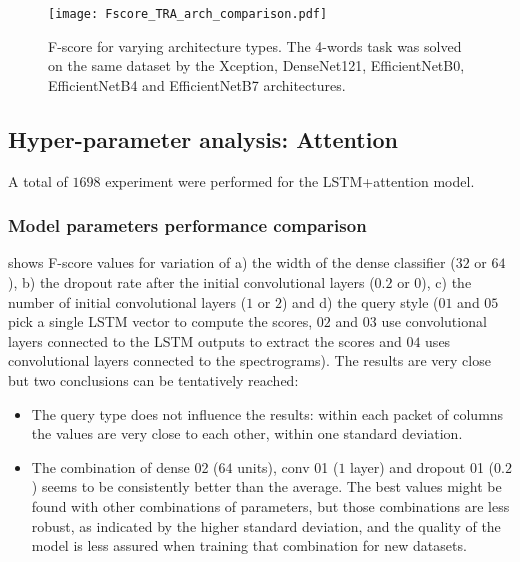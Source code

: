 
\begin{figure}[h!]
    \centering
    \texttt{[image: Fscore\_TRA\_arch\_comparison.pdf]}
    \caption{F-score for varying
        architecture types.
        The 4-words task was solved on the same dataset by the 
        Xception, DenseNet121, EfficientNetB0, EfficientNetB4 and
        EfficientNetB7 architectures.
    }%
    \label{fig:tra_comparison_arch}
\end{figure}

\subsection{Hyper-parameter analysis: Attention}

A total of $1698$ experiment were performed for the LSTM+attention model.

\subsubsection{Model parameters performance comparison}

 shows F-score values for variation of 
%
a) the width of the dense classifier ($32$ or $64$),
%
b) the dropout rate after the initial convolutional layers ($0.2$ or $0$),
%
c) the number of initial convolutional layers ($1$ or $2$) and
%
d) the query style ($01$ and $05$ pick a single LSTM vector to compute the
scores, $02$ and $03$ use convolutional layers connected to the LSTM outputs to
extract the scores and $04$  uses convolutional layers connected to the
spectrograms).
%
The results are very close but two conclusions can be tentatively reached:

\begin{itemize}
    \item The query type does not influence the results: within each packet of
        columns the values are very close to each other, within one standard
        deviation.
    \item The combination of dense 02 ($64$ units), conv 01 ($1$ layer) and
        dropout 01 ($0.2$) seems to be consistently better than the average.
        The best values might be found with other combinations of parameters,
        but those combinations are less robust, as indicated by the higher
        standard deviation, and the quality of the model is less assured when
        training that combination for new datasets.
\end{itemize}

